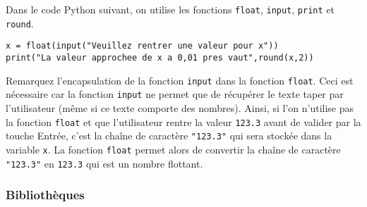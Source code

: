 \begin{example}
	Dans le code Python suivant, on utilise les fonctions \texttt{float}, \texttt{input}, \texttt{print} et \texttt{round}.
	\begin{lstlisting}[language=iPython]
x = float(input("Veuillez rentrer une valeur pour x"))
print("La valeur approchee de x a 0,01 pres vaut",round(x,2))
\end{lstlisting}
Remarquez l'encapsulation de la fonction \texttt{input} dans la fonction \texttt{float}. Ceci est nécessaire car la fonction \texttt{input} ne permet que de récupérer le texte taper par l'utilisateur (même si ce texte comporte des nombres). Ainsi, si l'on n'utilise pas la fonction \texttt{float} et que l'utilisateur rentre la valeur \texttt{123.3} avant de valider par la touche Entrée, c'est la chaîne de caractère \texttt{"123.3"} qui sera stockée dans la variable \texttt{x}. La fonction \texttt{float} permet alors de convertir la chaîne de caractère \texttt{"123.3"} en \texttt{123.3} qui est un nombre flottant.
\end{example}

\subsubsection{Bibliothèques}\label{bibliotheques}

